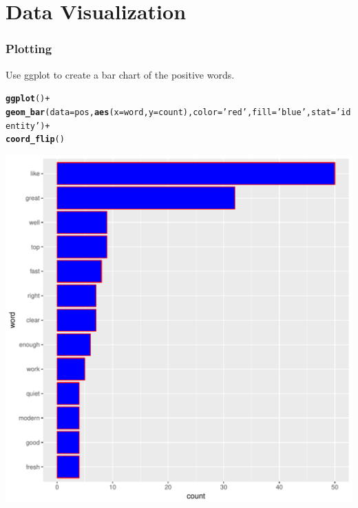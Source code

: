 \documentclass{beamer}\usepackage[]{graphicx}\usepackage[]{color}
\makeatletter
\def\maxwidth{ %
  \ifdim\Gin@nat@width>\linewidth
    \linewidth
  \else
    \Gin@nat@width
  \fi
}
\newcommand{\hlstr}[1]{\textcolor[rgb]{0.192,0.494,0.8}{#1}}%
\newcommand{\hlopt}[1]{\textcolor[rgb]{0,0,0}{#1}}%
\newcommand{\hlstd}[1]{\textcolor[rgb]{0.345,0.345,0.345}{#1}}%
\newcommand{\hlkwc}[1]{\textcolor[rgb]{0.333,0.667,0.333}{#1}}%
\newcommand{\hlkwd}[1]{\textcolor[rgb]{0.737,0.353,0.396}{\textbf{#1}}}%
\newenvironment{kframe}{%
 \def\at@end@of@kframe{}%
 \ifinner\ifhmode%
  \def\at@end@of@kframe{\end{minipage}}%
  \begin{minipage}{\columnwidth}%
 \fi\fi%
 \def\FrameCommand##1{\hskip\@totalleftmargin \hskip-\fboxsep
 \colorbox{shadecolor}{##1}\hskip-\fboxsep
     \hskip-\linewidth \hskip-\@totalleftmargin \hskip\columnwidth}%
 \MakeFramed {\advance\hsize-\width
   \@totalleftmargin\z@ \linewidth\hsize
   \@setminipage}}%
 {\par\unskip\endMakeFramed%
 \at@end@of@kframe}
\newenvironment{knitrout}{}{} %
\makeatother
\begin{document}
\section{Data Visualization}
\begin{frame}
\frametitle{Plotting}
Use ggplot to create a bar chart of the positive words. 
\begin{knitrout}
\color{fgcolor}\begin{kframe}
\begin{alltt}
\hlkwd{ggplot}\hlstd{()}\hlopt{+}
  \hlkwd{geom_bar}\hlstd{(}\hlkwc{data}\hlstd{=pos,}\hlkwd{aes}\hlstd{(}\hlkwc{x}\hlstd{=word,}\hlkwc{y}\hlstd{=count),}\hlkwc{color}\hlstd{=}\hlstr{'red'}\hlstd{,}\hlkwc{fill}\hlstd{=} \hlstr{'blue'}\hlstd{,}\hlkwc{stat}\hlstd{=}\hlstr{'identity'}\hlstd{)}\hlopt{+}
\hlkwd{coord_flip}\hlstd{()}
\end{alltt}
\end{kframe}
\includegraphics[width=\maxwidth]{figure/unnamed-chunk-12-1} 

\end{knitrout}
\framebreak
\end{frame}
\end{document}
